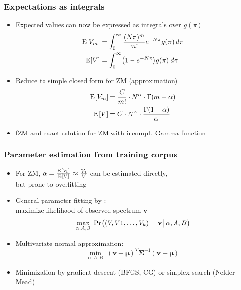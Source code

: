 \documentclass[handout,notes=show,t]{beamer} %
\begin{document}
\begin{frame}
  \frametitle{Expectations as integrals}

  \begin{itemize}
  \item Expected values can now be expressed as integrals over $g(\pi)$
    \begin{align*}
      \mathrm{E}_{}[V_m] &= \int_0^{\infty} \frac{(N\pi)^m}{m!} e^{-N\pi} g(\pi) \,\mathit{d{\pi}}\\
      \mathrm{E}_{}[V] &= \int_0^{\infty} \bigl( 1 - e^{-N\pi} \bigr) g(\pi) \,\mathit{d{\pi}}
    \end{align*}
  \item<2-> Reduce to simple closed form for ZM (approximation)
    \begin{align*}
      \mathrm{E}_{}[V_m] &= \frac{C}{m!} \cdot N^{\alpha} \cdot \Gamma (m - \alpha) \\
      \mathrm{E}_{}[V] &= C \cdot N^{\alpha} \cdot \frac{\Gamma(1 - \alpha)}{\alpha}
    \end{align*}
  \item<2-> fZM and exact solution for ZM with incompl.\ Gamma function
  \end{itemize}
\end{frame}

\begin{frame}
  \frametitle{Parameter estimation from training corpus}

  \begin{itemize}
  \item For ZM, $\alpha = \frac{\mathrm{E}_{}[V_1]}{\mathrm{E}_{}[V]} \approx \frac{V_1}{V}$ can be estimated directly,\\
    but prone to overfitting
  \item General parameter fitting by :\\
    maximize likelihood of observed spectrum $\mathbf{v}$
    \[
      \max_{\alpha, A, B}\; \mathop{\mathrm{Pr}_{}}\bigl((V, V1, \ldots, V_k) = \mathbf{v}\!\bigm|\!\alpha, A, B\bigr)
    \]
  \item<2-> Multivariate normal approximation:\\
    \[
      \min_{\alpha, A, B}\; (\mathbf{v} - \pmb{\mu})^T \pmb{\Sigma}^{-1} (\mathbf{v} - \pmb{\mu})
    \]
  \item<2-> Minimization by gradient descent (BFGS, CG) or simplex search (Nelder-Mead)
  \end{itemize}
\end{frame}
\end{document}
